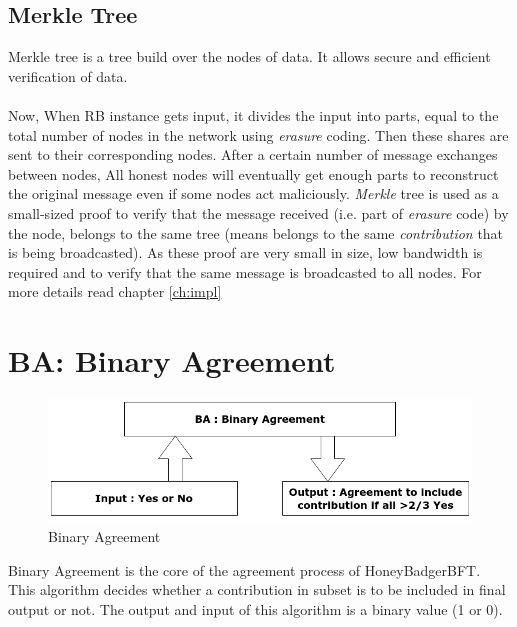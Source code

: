 \subsection{Merkle Tree}
Merkle tree\cite{Merkle_tree}\cite{merkle1980protocols} is a tree build over the nodes of data. It allows secure and efficient verification of data.
\\\\
Now, When RB instance gets input, it divides the input into parts, equal to the total number of nodes in the network using \textit{erasure} coding. Then these shares are sent to their corresponding nodes. After a certain number of message exchanges between nodes, All honest nodes will eventually get enough parts to reconstruct the original message even if some nodes act maliciously. \textit{Merkle} tree is used as a small-sized proof to verify that the message received (i.e. part of \textit{erasure} code) by the node, belongs to the same tree (means belongs to the same \textit{contribution} that is being broadcasted). As these proof are very small in size, low bandwidth is required and to verify that the same message is broadcasted to all nodes.
For more details read chapter \ref{ch:impl}

\section{BA: Binary Agreement}

\begin{figure}[!h]
    \centering
    \includegraphics[scale=0.5]{images/BA.png}
    \caption{Binary Agreement\cite{POANetwork}}
    \label{fig:ba}
\end{figure}
Binary Agreement\cite{10.1145/2611462.2611468}\cite{POANetwork} is the core of the agreement process of HoneyBadgerBFT. This algorithm decides whether a contribution in subset is to be included in final output or not.
The output and input of this algorithm is a binary value (1 or 0).

